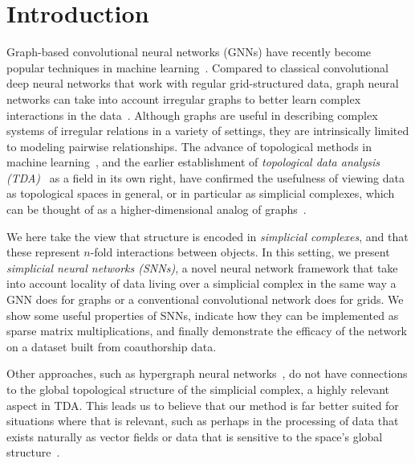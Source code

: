 \section{Introduction}

Graph-based convolutional neural networks (GNNs) have recently become popular techniques in machine learning~\cite{defferrard2016convolutional, bronstein2017geometric, wu2020survey}. Compared to classical convolutional deep neural networks that work with regular grid-structured data, graph neural networks can take into account irregular graphs to better learn complex interactions in the data~\cite{battaglia2018relational}. Although graphs are useful in describing complex systems of irregular relations in a variety of settings, they are intrinsically limited to modeling pairwise relationships. The advance of topological methods in machine learning~\cite{Gabrielsson2020topological, Hofer2019LearningRO, rieck2018neural}, and the earlier establishment of \emph{topological data analysis (TDA)}~\cite{carlsson2008,chazal2017,edelsbrunner2010computational,ghrist2008barcodes} as a field in its own right, have confirmed the usefulness of viewing data as topological spaces in general, or in particular as simplicial complexes, which can be thought of as a higher-dimensional analog of graphs~\cite{moore2012,patania2017}.

We here take the view that structure is encoded in \emph{simplicial complexes}, and that these represent $n$-fold interactions between objects. In this setting, we present \emph{simplicial neural networks (SNNs)}, a novel neural network framework that take into account locality of data living over a simplicial complex in the same way a GNN does for graphs or a conventional convolutional network does for grids. We show some useful properties of SNNs, indicate how they can be implemented as sparse matrix multiplications, and finally demonstrate the efficacy of the network on a dataset built from coauthorship data.

Other approaches, such as hypergraph neural networks~\cite{feng2018hypergraphs}, do not have connections to the global topological structure of the simplicial complex, a highly relevant aspect in TDA. This leads us to believe that our method is far better suited for situations where that is relevant, such as perhaps in the processing of data that exists naturally as vector fields or data that is sensitive to the space's global structure~\cite{perraudin2019deepsphere}.
